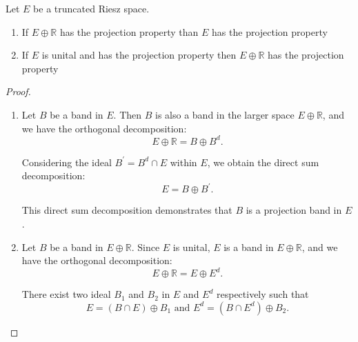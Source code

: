 \documentclass[10pt,a4paper]{amsart}
\begin{document}
\begin{theorem}
	Let $E$ be a truncated Riesz space.
	
	\begin{enumerate}
		\item If $E\oplus 
		\mathbb{R}
		$ has the projection property than $E$ has the projection property
		
		\item If $E$ is unital and has the projection property then $E\oplus 
		\mathbb{R}
		$ has the projection property
	\end{enumerate}
\end{theorem}

\begin{proof}
	
	\begin{enumerate}
		\item Let $B$ be a band in $E$. Then $B$ is also a band in the larger space $%
		E\oplus 
		\mathbb{R}
		$, and we have the orthogonal decomposition:%
		\begin{equation*}
			E\oplus 
			\mathbb{R}
			=B\oplus B^{d}.
		\end{equation*}
		
		Considering the ideal $B^{\prime }=B^{d}\cap E$ within $E$, we obtain the
		direct sum decomposition: 
		\begin{equation*}
			E=B\oplus B^{\prime }.
		\end{equation*}
		
		This direct sum decomposition demonstrates that $B$ is a projection band in $%
		E$.
		
		\item Let $B$ be a band in $E\oplus 
		\mathbb{R}
		$. Since $E$ is unital, $E$ is a band in $E\oplus 
		\mathbb{R}
		$, and we have the orthogonal decomposition:%
		\begin{equation*}
			E\oplus 
			\mathbb{R}
			=E\oplus E^{d}.
		\end{equation*}
		
		There exist two ideal $B_{1}$ and $B_{2}$ in $E$ and $E^{d}$ respectively
		such that 
		\begin{equation*}
			E=\left( B\cap E\right) \oplus B_{1}\text{ and }E^{d}=\left( B\cap
			E^{d}\right) \oplus B_{2}.
		\end{equation*}
		

\end{enumerate}
\end{proof}
\end{document}

